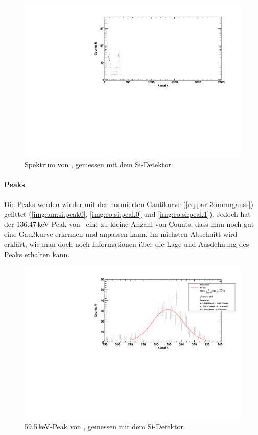 \begin{figure}[H]
\begin{center}
  \includegraphics[width=\textwidth]{../img/part3/Am-Si_spectrum.pdf}
  \caption{Spektrum von \am, gemessen mit dem Si-Detektor.}
  \label{img:si:am:spektrum}
\end{center}
\end{figure}

\paragraph{Peaks}
Die Peaks werden wieder mit der normierten Gaußkurve (\autoref{eq:part3:normgauss}) gefittet 
(\autoref{img:am:si:peak0}, \autoref{img:co:si:peak0} und \autoref{img:co:si:peak1}). Jedoch hat der 136.47\,keV-Peak von \co\ eine zu kleine 
Anzahl von Counts, dass man noch gut eine Gaußkurve erkennen und anpassen kann. Im nächsten Abschnitt wird erklärt, wie man doch noch 
Informationen über die Lage und Ausdehnung des Peaks erhalten kann.
\begin{figure}[H]
\begin{center}
  \includegraphics[width=\textwidth]{../img/part3/Am-Si_00.pdf}
  \caption{59.5\,keV-Peak von \am, gemessen mit dem Si-Detektor.}
  \label{img:am:si:peak0}
\end{center}
\end{figure}

